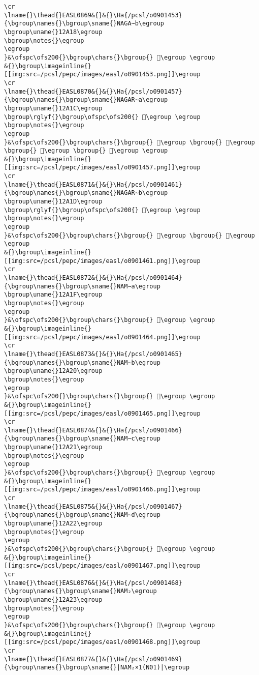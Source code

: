 \begin{verbatim}
\cr
\lname{}\thead{}EASL0869&{}&{}\Ha{/pcsl/o0901453}{\bgroup\names{}\bgroup\sname{}NAGA∼b\egroup
\bgroup\uname{}12A18\egroup
\bgroup\notes{}\egroup
\egroup
}&\ofspc\ofs200{}\bgroup\chars{}\bgroup{} 𒨘\egroup \egroup
&{}\bgroup\imageinline{}[[img:src=/pcsl/pepc/images/easl/o0901453.png]]\egroup
\cr
\lname{}\thead{}EASL0870&{}&{}\Ha{/pcsl/o0901457}{\bgroup\names{}\bgroup\sname{}NAGAR∼a\egroup
\bgroup\uname{}12A1C\egroup
\bgroup\rglyf{}\bgroup\ofspc\ofs200{} 𒨜\egroup \egroup
\bgroup\notes{}\egroup
\egroup
}&\ofspc\ofs200{}\bgroup\chars{}\bgroup{} 𒨙\egroup \bgroup{} 𒨚\egroup \bgroup{} 𒨛\egroup \bgroup{} 𒨜\egroup \egroup
&{}\bgroup\imageinline{}[[img:src=/pcsl/pepc/images/easl/o0901457.png]]\egroup
\cr
\lname{}\thead{}EASL0871&{}&{}\Ha{/pcsl/o0901461}{\bgroup\names{}\bgroup\sname{}NAGAR∼b\egroup
\bgroup\uname{}12A1D\egroup
\bgroup\rglyf{}\bgroup\ofspc\ofs200{} 𒨝\egroup \egroup
\bgroup\notes{}\egroup
\egroup
}&\ofspc\ofs200{}\bgroup\chars{}\bgroup{} 𒨝\egroup \bgroup{} 𒨞\egroup \egroup
&{}\bgroup\imageinline{}[[img:src=/pcsl/pepc/images/easl/o0901461.png]]\egroup
\cr
\lname{}\thead{}EASL0872&{}&{}\Ha{/pcsl/o0901464}{\bgroup\names{}\bgroup\sname{}NAM∼a\egroup
\bgroup\uname{}12A1F\egroup
\bgroup\notes{}\egroup
\egroup
}&\ofspc\ofs200{}\bgroup\chars{}\bgroup{} 𒨟\egroup \egroup
&{}\bgroup\imageinline{}[[img:src=/pcsl/pepc/images/easl/o0901464.png]]\egroup
\cr
\lname{}\thead{}EASL0873&{}&{}\Ha{/pcsl/o0901465}{\bgroup\names{}\bgroup\sname{}NAM∼b\egroup
\bgroup\uname{}12A20\egroup
\bgroup\notes{}\egroup
\egroup
}&\ofspc\ofs200{}\bgroup\chars{}\bgroup{} 𒨠\egroup \egroup
&{}\bgroup\imageinline{}[[img:src=/pcsl/pepc/images/easl/o0901465.png]]\egroup
\cr
\lname{}\thead{}EASL0874&{}&{}\Ha{/pcsl/o0901466}{\bgroup\names{}\bgroup\sname{}NAM∼c\egroup
\bgroup\uname{}12A21\egroup
\bgroup\notes{}\egroup
\egroup
}&\ofspc\ofs200{}\bgroup\chars{}\bgroup{} 𒨡\egroup \egroup
&{}\bgroup\imageinline{}[[img:src=/pcsl/pepc/images/easl/o0901466.png]]\egroup
\cr
\lname{}\thead{}EASL0875&{}&{}\Ha{/pcsl/o0901467}{\bgroup\names{}\bgroup\sname{}NAM∼d\egroup
\bgroup\uname{}12A22\egroup
\bgroup\notes{}\egroup
\egroup
}&\ofspc\ofs200{}\bgroup\chars{}\bgroup{} 𒨢\egroup \egroup
&{}\bgroup\imageinline{}[[img:src=/pcsl/pepc/images/easl/o0901467.png]]\egroup
\cr
\lname{}\thead{}EASL0876&{}&{}\Ha{/pcsl/o0901468}{\bgroup\names{}\bgroup\sname{}NAM₂\egroup
\bgroup\uname{}12A23\egroup
\bgroup\notes{}\egroup
\egroup
}&\ofspc\ofs200{}\bgroup\chars{}\bgroup{} 𒨣\egroup \egroup
&{}\bgroup\imageinline{}[[img:src=/pcsl/pepc/images/easl/o0901468.png]]\egroup
\cr
\lname{}\thead{}EASL0877&{}&{}\Ha{/pcsl/o0901469}{\bgroup\names{}\bgroup\sname{}|NAM₂×1(N01)|\egroup

\end{verbatim}
